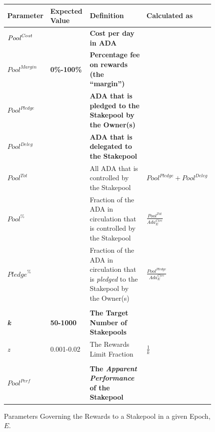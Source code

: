 \documentclass[11pt,a4paper,dvipsnames,twosided,final]{article}
\newcommand{\ada}{ADA{}}
\begin{document}
\begin{figure}[h!]
\begin{center}
\begin{tabular}{||l|l|p{6cm}|l||}
  \hline \hline
\textbf{Parameter} & \textbf{Expected Value} & \textbf{Definition} & \textbf{Calculated as} \\\hline
\textbf{\color{red} $\textit{\textit{Pool}}^{\textit{Cost}}$} &  & \textbf{\color{red} Cost per day in \ada{}} & \\\hline
\textbf{\color{red} ${\textit{Pool}}^{\textit{Margin}}$} &  \textbf{\color{red} 0\%-100\%} & \textbf{\color{red} Percentage fee on rewards (the ``margin'')} & \\\hline
\textbf{\color{red} ${Pool}^\textit{Pledge}$} & & \textbf{\color{red} \ada{} that is pledged to the Stakepool by the Owner(s)} & \\\hline
\textbf{\color{blue} ${\textit{Pool}}^\textit{Deleg}$} & & \textbf{\color{blue} \ada{} that is delegated to the Stakepool} & \\\hline
${\textit{Pool}}^{Tot}$ & & All \ada{} that is controlled by the Stakepool & ${\textit{Pool}}^\textit{Pledge} + {\textit{Pool}}^\textit{Deleg}$ \\\hline
${\textit{Pool}}^\%$ & & Fraction of the \ada{} in circulation that is controlled by the Stakepool & {\large $\frac{{\textit{Pool}}^{Tot}}{\textit{Ada}^{\textit{Circ}}_E}$} \\\hline
${\textit{Pledge}}^\%$ & & Fraction of the \ada{} in circulation that is \emph{pledged} to the Stakepool by the Owner(s) & {\large $\frac{{\textit{Pool}}^{Pledge}}{\textit{Ada}^{\textit{Circ}}_E}$} \\\hline
&&&  \\\hline
\textbf{\color{green} \emph{k}} & \textbf{\color{green} 50-1000} & \textbf{\color{green} The Target Number of Stakepools} & \\\hline
\emph{z} & 0.001-0.02 & The Rewards Limit Fraction & $\frac{1}{k}$ \\\hline
&&&  \\\hline
\textbf{\color{cyan} $\textit{Pool}^{\textit{Perf}}$} & & \textbf{\color{cyan} The \emph{Apparent Performance} of the Stakepool} & \\\hline
  \hline
\end{tabular}
\end{center}
\caption{Parameters Governing the Rewards to a Stakepool in a given Epoch, $E$.}
\label{fig:rewards-mainnet}
\end{figure}
\end{document}
